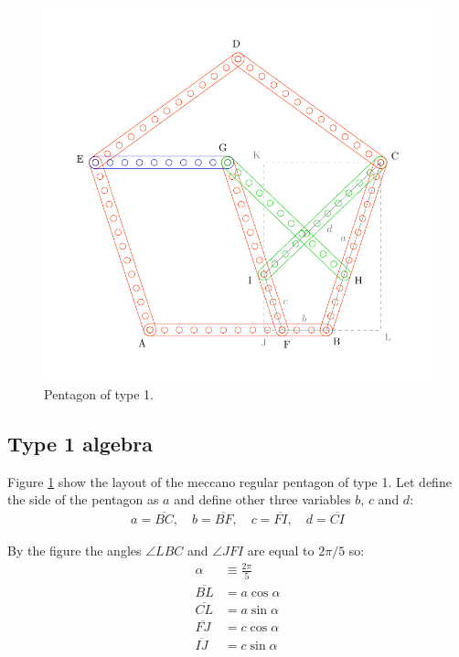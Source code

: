 \documentclass[11pt]{article}
\begin{document}
\begin{figure}
\centering
\includegraphics[scale=0.8]{types/1}
\caption{Pentagon of type 1.}
\label{fig:type-1}
\end{figure}

\subsection{Type 1 algebra}

Figure \ref{fig:type-1} show the layout of the meccano regular pentagon of type 1.
Let define the side of the pentagon as $a$ and define other three variables $b$, $c$ and $d$:
\begin{align*}
a = \overline{BC},\quad
b = \overline{BF},\quad
c = \overline{FI},\quad
d = \overline{CI}
\end{align*}

By the figure the angles $\angle{LBC}$ and $\angle{JFI}$ are equal to $2\pi / 5$ so:
\begin{align}
\alpha &\equiv \frac{2\pi}{5}\\
\overline{BL} &= a\cos{\alpha}\\
\overline{CL} &= a\sin{\alpha}\\
\overline{FJ} &= c\cos{\alpha}\\
\overline{IJ} &= c\sin{\alpha}
\end{align}
\end{document}
